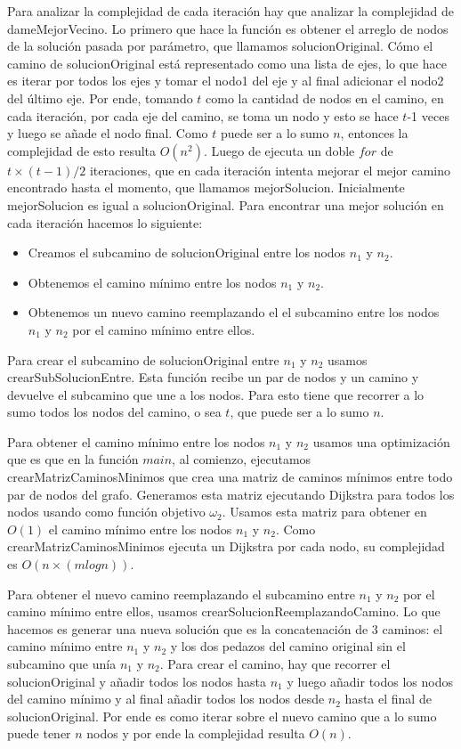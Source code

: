Para analizar la complejidad de cada iteración hay que analizar la complejidad de dameMejorVecino. 
Lo primero que hace la función es obtener el arreglo de nodos de la solución pasada por parámetro, que llamamos solucionOriginal. Cómo el camino de solucionOriginal está representado como una lista de ejes, lo que hace es iterar por todos los ejes y tomar el nodo1 del eje y al final adicionar el nodo2 del último eje. Por ende, tomando $t$ como la cantidad de nodos en el camino, en cada iteración, por cada eje del camino, se toma un nodo y esto se hace $t$-1 veces y luego se añade el nodo final. Como $t$ puede ser a lo sumo $n$, entonces la complejidad de esto resulta $O(n^2)$.
Luego de ejecuta un doble $for$ de $t \times (t-1) / 2$ iteraciones, que en cada iteración intenta mejorar el mejor camino encontrado hasta el momento, que llamamos mejorSolucion. Inicialmente mejorSolucion es igual a solucionOriginal. 
Para encontrar una mejor solución en cada iteración hacemos lo siguiente:

\begin{itemize}
\item Creamos el subcamino de solucionOriginal entre los nodos $n_1$ y $n_2$.
\item Obtenemos el camino mínimo entre los nodos $n_1$ y $n_2$.
\item Obtenemos un nuevo camino reemplazando el el subcamino entre los nodos $n_1$ y $n_2$ por el camino mínimo entre ellos.
\end{itemize}

Para crear el subcamino de solucionOriginal entre $n_1$ y $n_2$ usamos crearSubSolucionEntre. Esta función recibe un par de nodos y un camino y devuelve el subcamino que une a los nodos. Para esto tiene que recorrer a lo sumo todos los nodos del camino, o sea $t$, que puede ser a lo sumo $n$.

Para obtener el camino mínimo entre los nodos $n_1$ y $n_2$ usamos una optimización que es que en la función $main$, al comienzo, ejecutamos crearMatrizCaminosMinimos que crea una matriz de caminos mínimos entre todo par de nodos del grafo. Generamos esta matriz ejecutando Dijkstra para todos los nodos usando como función objetivo $\omega_2$. Usamos esta matriz para obtener en $O(1)$ el camino mínimo entre los nodos $n_1$ y $n_2$.
Como crearMatrizCaminosMinimos ejecuta un Dijkstra por cada nodo, su complejidad es $O(n \times (m log n))$.

Para obtener el nuevo camino reemplazando el subcamino entre $n_1$ y $n_2$ por el camino mínimo entre ellos, usamos crearSolucionReemplazandoCamino.
Lo que hacemos es generar una nueva solución que es la concatenación de 3 caminos: el camino mínimo entre $n_1$ y $n_2$ y los dos pedazos del camino original sin el subcamino que unía $n_1$ y $n_2$. Para crear el camino, hay que recorrer el solucionOriginal y añadir todos los nodos hasta $n_1$ y luego añadir todos los nodos del camino mínimo y al final añadir todos los nodos desde $n_2$ hasta el final de solucionOriginal. Por ende es como iterar sobre el nuevo camino que a lo sumo puede tener $n$ nodos y por ende la complejidad resulta $O(n)$.

